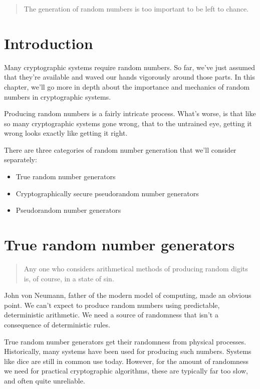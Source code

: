\documentclass[11pt,ebook,table,dvipsnames]{memoir}
\begin{document}
\begin{quotation}
The generation of random numbers is too important to be left to chance.
\end{quotation}

\section{Introduction}
\label{sec-2-10-1}

Many cryptographic systems require random numbers. So far, we've just
assumed that they're available and waved our hands vigorously around
those parts. In this chapter, we'll go more in depth about the
importance and mechanics of random numbers in cryptographic systems.

Producing random numbers is a fairly intricate process. What's worse,
is that like so many cryptographic systems gone wrong, that to the
untrained eye, getting it wrong looks exactly like getting it right.

There are three categories of random number generation that we'll
consider separately:

\begin{itemize}
\item True random number generators
\item Cryptographically secure pseudorandom number generators
\item Pseudorandom number generators
\end{itemize}
\section{True random number generators}
\label{sec-2-10-2}

\begin{quotation}
Any one who considers arithmetical methods of producing random digits
is, of course, in a state of sin.
\end{quotation}

John von Neumann, father of the modern model of computing, made an
obvious point. We can't expect to produce random numbers using
predictable, deterministic arithmetic. We need a source of randomness
that isn't a consequence of deterministic rules.

True random number generators get their randomness from physical
processes. Historically, many systems have been used for producing
such numbers. Systems like dice are still in common use today.
However, for the amount of randomness we need for practical
cryptographic algorithms, these are typically far too slow, and often
quite unreliable.
\end{document}
